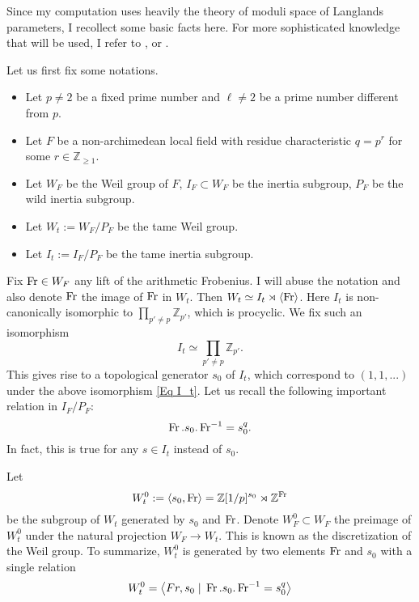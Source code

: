 	Since my computation uses heavily the theory of moduli space of Langlands parameters, I recollect some basic facts here. For more sophisticated knowledge that will be used, I refer to \cite[Section 3 and Section 4]{dat2022ihes}, or \cite[Section 2 and Section 4]{dhkm2020moduli}. 
	
	Let us first fix some notations.
	\begin{itemize}
		\item Let $p \neq 2$ be a fixed prime number and $\ell \neq 2$ be a prime number different from $p$. 
		\item Let $F$ be a non-archimedean local field with residue characteristic $q=p^r$ for some $r \in \mathbb{Z}_{\geq 1}$.
		\item Let $W_F$ be the Weil group of $F$, $I_F \subset W_F$ be the inertia subgroup, $P_F$ be the wild inertia subgroup.
		\item Let $W_t:=W_F/P_F$ be the tame Weil group.
		\item Let $I_t:=I_F/P_F$ be the tame inertia subgroup.
	\end{itemize}
	     Fix $\operatorname{Fr} \in W_F$ any lift of the arithmetic Frobenius. I will abuse the notation and also denote $\operatorname{Fr}$ the image of $\operatorname{Fr}$ in $W_t$. Then $W_t \simeq I_t \rtimes \left<\operatorname{Fr}\right>$. Here $I_t$ is non-canonically isomorphic to $\prod_{p'\neq p}\mathbb{Z}_{p'}$, which is procyclic. We fix such an isomorphism
	     \begin{equation}\label{Eq I_t}
	     	I_t \simeq \prod_{p'\neq p}\mathbb{Z}_{p'}.
	     \end{equation}
    This gives rise to a topological generator $s_0$ of $I_t$, which correspond to $(1, 1, ...)$ under the above isomorphism \eqref{Eq I_t}. Let us recall the following important relation in $I_F/P_F$:
	\begin{equation}\label{Eq Fr s_0}
		\operatorname{Fr}.s_0.\operatorname{Fr}^{-1}=s_0^q.
	\end{equation}
	In fact, this is true for any $s \in I_t$ instead of $s_0$.
	
	Let 
	$$W_t^0:=\left<s_0, \operatorname{Fr}\right>=\mathbb{Z}[1/p]^{s_0} \rtimes \mathbb{Z}^{\operatorname{Fr}}$$ 
	be the subgroup of $W_t$ generated by $s_0$ and $\operatorname{Fr}$. Denote $W_F^0 \subset W_F$ the preimage of $W_t^0$ under the natural projection $W_F \to W_t$. This is known as the discretization of the Weil group. To summarize, $W_t^0$ is generated by two elements $\operatorname{Fr}$ and $s_0$ with a single relation 
	\begin{equation}\label{Equation presentation of the tame Weil group}
		W_t^0=\left<Fr, s_0\;|\;\operatorname{Fr}.s_0.\operatorname{Fr}^{-1}=s_0^q\right>
	\end{equation} 
	
